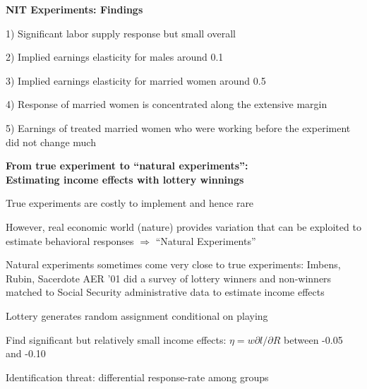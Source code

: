 \documentclass[landscape]{slides}
\begin{document}
\begin{slide}
\begin{center}
{\bf NIT Experiments: Findings}
\end{center}

1) Significant labor supply response but small overall

2) Implied earnings elasticity for males around 0.1

3) Implied earnings elasticity for married women around 0.5

4) Response of married women is concentrated along the extensive margin

5) Earnings of treated married women who were working before the
experiment did not change much

\end{slide}

%
%
%
%


\begin{slide}
\begin{center}
{\bf From true experiment to ``natural experiments'': \\ Estimating income effects with lottery winnings}
\end{center}
True experiments are costly to implement and hence rare

However, real economic world (nature) provides variation that can
be exploited to estimate behavioral responses $\Rightarrow$
``Natural Experiments''

Natural experiments sometimes come very close to true experiments:
Imbens, Rubin, Sacerdote AER '01 did a survey of lottery winners
and non-winners matched to Social Security administrative data to
estimate income effects

Lottery generates random assignment conditional on playing

Find significant but relatively small income effects: $\eta = w
\partial l/\partial R$ between -0.05 and -0.10

Identification threat: differential response-rate among groups
\end{slide}
\end{document}

